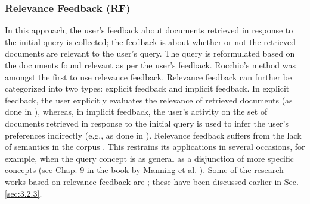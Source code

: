 \subsubsection{Relevance Feedback (RF)}
In this approach, the user's feedback about documents retrieved in response to the initial query is collected; the feedback is about  whether or not the retrieved documents are relevant to the user's query. The query is reformulated based on the documents found relevant as per the user's feedback. Rocchio's method \cite{rocchio1971relevance} was amongst the first to use relevance feedback. Relevance feedback can further be categorized into two types: explicit feedback and implicit feedback. In explicit feedback, the user explicitly evaluates the relevance of retrieved documents (as done in \cite{Salton90improvingretrieval,harman1992relevance}), whereas, in implicit feedback, the user's activity on the set of documents retrieved in response to the initial query is used to infer the user's preferences indirectly (e.g., as done in \cite{chirita2007personalized,zhou2012improving,gao2015pattern}). Relevance feedback suffers from  the lack of semantics in the corpus \cite{wu2011study}. This restrains its applications in several occasions, for example, when the query concept is as general as a disjunction of more specific concepts (see Chap. 9 in the book by Manning et al. \cite{Manning:2008:IIR:1394399}). Some of the research works based on relevance feedback are  \cite{buckley1994effect,salton1997improving,ruthven2003survey,Manning:2008:IIR:1394399}; these have been discussed earlier in Sec. \ref{sec:3.2.3}. 

